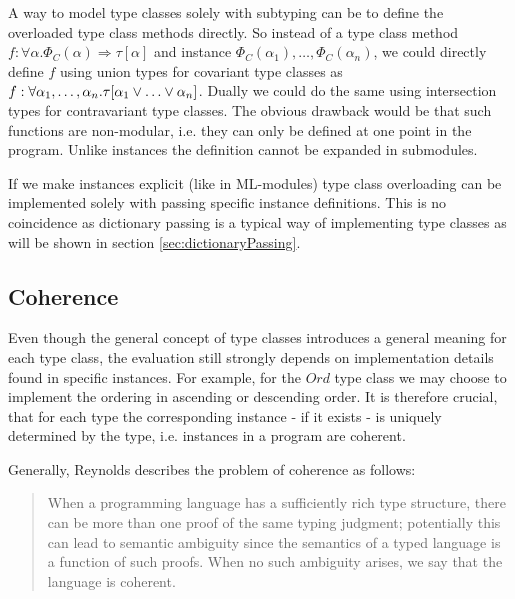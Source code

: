 A way to model type classes solely with subtyping can be to define the overloaded type class methods directly.
So instead of a type class method $f : \forall \alpha. \Phi_C(\alpha) \Rightarrow \tau[\alpha]$ and instance $\Phi_C(\alpha_1), \dots, \Phi_C(\alpha_n)$,
we could directly define $f$ using union types for covariant type classes as $f : \forall \alpha_1,\dots,\alpha_n. \tau[\alpha_1 \join \dots \join \alpha_n]$.
Dually we could do the same using intersection types for contravariant type classes.
The obvious drawback would be that such functions are non-modular, i.e. they can only be defined at one point in the program.
Unlike instances the definition cannot be expanded in submodules.

If we make instances explicit (like in ML-modules) type class overloading can be implemented solely with passing specific instance definitions.
This is no coincidence as dictionary passing is a typical way of implementing type classes as will be shown in section \ref{sec:dictionaryPassing}.

\subsection{Coherence}\label{sec:coherence}

Even though the general concept of type classes introduces a general meaning for each type class, the evaluation still strongly depends on implementation details found in specific instances.
For example, for the $\mathit{Ord}$ type class we may choose to implement the ordering in ascending or descending order.
It is therefore crucial, that for each type the corresponding instance - if it exists - is uniquely determined by the type, i.e. instances in a program are coherent.

Generally, Reynolds \cite{reynolds_coherence} describes the problem of coherence as follows:

\begin{quote}
  When a programming language has a sufficiently rich type structure, there can be more than one proof of the same
  typing judgment; potentially this can lead to semantic ambiguity since the semantics of a typed language is a function
  of such proofs. When no such ambiguity arises, we say that the language is coherent.
\end{quote}

